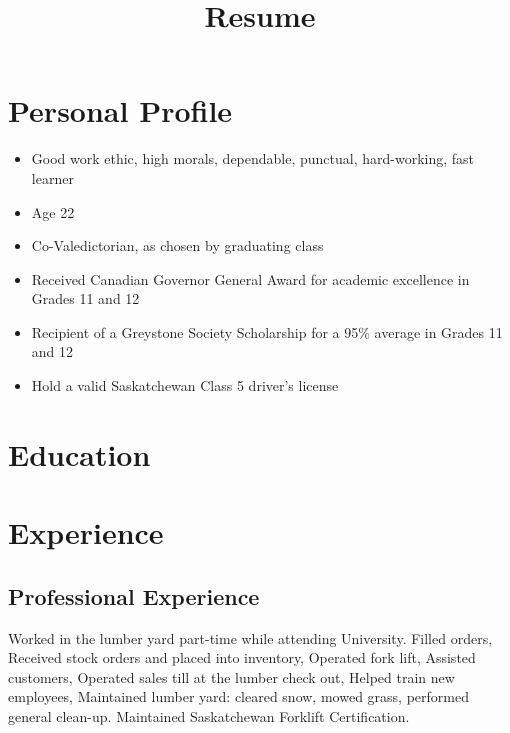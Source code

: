\documentclass[11pt,letterpaper,sans]{moderncv}        %
\title{Resume}                               %
\begin{document}
\makecvtitle
\vspace*{-1cm} %

\section{Personal Profile}
\cvitem{}
{
  \begin{itemize}
    \item Good work ethic, high morals, dependable, punctual, hard-working, fast learner
    \item Age 22
    \item Co-Valedictorian, as chosen by graduating class
    \item Received Canadian Governor General Award for academic excellence in Grades 11 and 12
    \item Recipient of a Greystone Society Scholarship for a 95\% average in Grades 11 and 12
    \item Hold a valid Saskatchewan Class 5 driver's license
  \end{itemize}
}

\section{Education}


\section{Experience}
\subsection{Professional Experience}
{
  Worked in the lumber yard part-time while attending University.
  \newline{}
  Filled orders, Received stock orders and placed into inventory, Operated fork lift, Assisted customers, Operated sales till at the lumber check out, Helped train new employees, Maintained  lumber yard: cleared snow, mowed grass, performed general clean-up.
  \newline{}
  Maintained Saskatchewan Forklift Certification.
}
\end{document}
